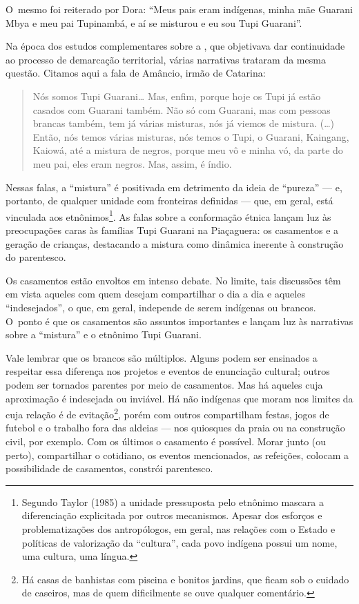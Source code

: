 O~mesmo foi reiterado por Dora: ``Meus pais eram indígenas, minha mãe
Guarani Mbya e meu pai Tupinambá, e aí se misturou e eu sou Tupi
Guarani''.

Na época dos estudos complementares sobre a , que objetivava dar
continuidade ao processo de demarcação territorial, várias narrativas
trataram da mesma questão. Citamos aqui a fala de Amâncio, irmão de
Catarina:

\begin{quote}
\noindent
Nós somos Tupi Guarani\ldots{} Mas, enfim, porque hoje os Tupi já estão
casados com Guarani também. Não só com Guarani, mas com pessoas brancas
também, tem já várias misturas, nós já viemos de mistura. (\ldots{}) Então,
nós temos várias misturas, nós temos o Tupi, o Guarani, Kaingang,
Kaiowá, até a mistura de negros, porque meu vô e minha vó, da parte do
meu pai, eles eram negros. Mas, assim, é índio.
\end{quote} 

Nessas falas, a ``mistura'' é positivada em detrimento da ideia de ``pureza'' ---
e, portanto, de qualquer unidade com fronteiras definidas --- que, em
geral, está vinculada aos etnônimos\footnote{Segundo Taylor (1985) a
unidade pressuposta pelo etnônimo mascara a diferenciação explicitada
por outros mecanismos. Apesar dos esforços e problematizações dos
antropólogos, em geral, nas relações com o Estado e políticas de
valorização da ``cultura'', cada povo indígena possui um nome, uma
cultura, uma língua.}. As falas sobre a conformação étnica lançam luz
às preocupações caras às famílias Tupi Guarani na  Piaçaguera: os
casamentos e a geração de crianças, destacando a mistura como dinâmica
inerente à construção do parentesco.

Os casamentos estão envoltos em intenso debate. No limite, tais
discussões têm em vista aqueles com quem desejam compartilhar o dia a
dia e aqueles ``indesejados'', o que, em geral, independe de serem
indígenas ou brancos. O~ponto é que os casamentos são assuntos
importantes e lançam luz às narrativas sobre a ``mistura'' e o etnônimo
Tupi Guarani.

Vale lembrar que os brancos são múltiplos. Alguns podem ser ensinados a
respeitar essa diferença nos projetos e eventos de enunciação cultural;
outros podem ser tornados parentes por meio de casamentos. Mas há
aqueles cuja aproximação é indesejada ou inviável. Há não indígenas que
moram nos limites da  cuja relação é de evitação\footnote{Há casas de
banhistas com piscina e bonitos jardins, que ficam sob o cuidado de
caseiros, mas de quem dificilmente se ouve qualquer comentário.}, porém
com outros compartilham festas, jogos de futebol e o trabalho fora das
aldeias --- nos quiosques da praia ou na construção civil, por exemplo.
Com os últimos o casamento é possível. Morar junto (ou perto),
compartilhar o cotidiano, os eventos mencionados, as refeições, colocam
a possibilidade de casamentos, constrói parentesco. 

